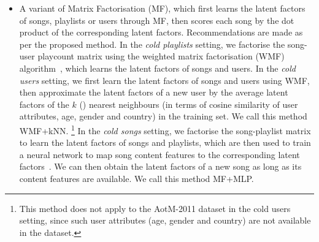 \begin{itemize}
\item A variant of Matrix Factorisation (MF), which first learns the latent factors of songs, playlists
      or users through MF, then scores each song by the dot product of the corresponding latent factors.
      Recommendations are made as per the proposed method.
      In the \emph{cold playlists} setting, we factorise the song-user playcount matrix using the 
      weighted matrix factorisation (WMF) algorithm~\cite{hu2008collaborative}, which learns the 
      latent factors of songs and users.
      In the \emph{cold users} setting, we first learn the latent factors of songs and users using WMF,
      then approximate the latent factors of a new user by the average latent factors of the $k$ ()
      nearest neighbours %
      (in terms of cosine similarity of user attributes, \eg age, gender and country) in the training set.
      We call this method WMF+kNN.
      \footnote{This method does not apply to the AotM-2011 dataset in the cold users setting,
      since such user attributes (\eg age, gender and country) are not available in the dataset.}
      In the \emph{cold songs} setting, we factorise the song-playlist matrix to learn the latent factors of 
      songs and playlists, which are then used to train a neural network to map song content features 
      to the corresponding latent factors~\cite{Gantner:2010,van2013deep}.
	  We can then obtain the latent factors of a new song as long as its content features are available.
      We call this method MF+MLP. 
%

\end{itemize}
